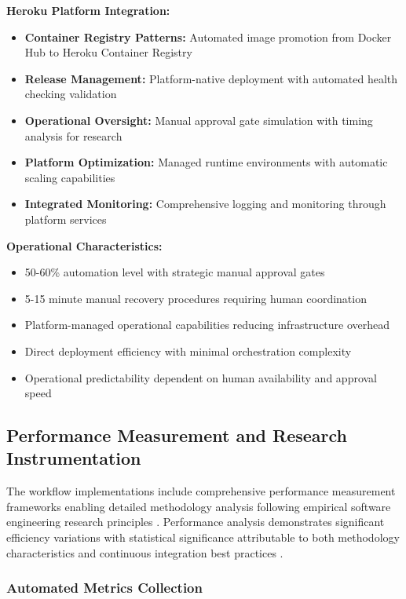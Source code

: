 \textbf{Heroku Platform Integration:}
\begin{itemize}
\item \textbf{Container Registry Patterns:} Automated image promotion from Docker Hub to Heroku Container Registry
\item \textbf{Release Management:} Platform-native deployment with automated health checking validation
\item \textbf{Operational Oversight:} Manual approval gate simulation with timing analysis for research
\item \textbf{Platform Optimization:} Managed runtime environments with automatic scaling capabilities
\item \textbf{Integrated Monitoring:} Comprehensive logging and monitoring through platform services
\end{itemize}

\textbf{Operational Characteristics:}
\begin{itemize}
\item 50-60\% automation level with strategic manual approval gates
\item 5-15 minute manual recovery procedures requiring human coordination
\item Platform-managed operational capabilities reducing infrastructure overhead
\item Direct deployment efficiency with minimal orchestration complexity
\item Operational predictability dependent on human availability and approval speed
\end{itemize}

\subsection{Performance Measurement and Research Instrumentation}

The workflow implementations include comprehensive performance measurement frameworks enabling detailed methodology analysis following empirical software engineering research principles \cite{empirical2022}. Performance analysis demonstrates significant efficiency variations with statistical significance \cite{statistics2023} attributable to both methodology characteristics and continuous integration best practices \cite{ci2021}.

\subsubsection{Automated Metrics Collection}

